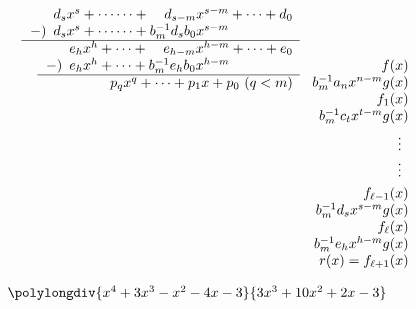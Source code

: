 \begin{table}
\begin{lrbox}{\EuclidChangchu}
\begin{math}
\begin{array}{@{}l@{\hspace*{-6pt}}c@{\hspace*{-7pt}}l@{\hspace*{-11pt}}r@{\hspace*{-14pt}}l@{}}
\begin{array}[t]{l}
\begin{array}{r}
\begin{array}{r@{\hspace{5pt}}r@{{}+\dotsb\dotsb+{}}r@{}l}
               & d_sx^s &     d_{s-m}x^{s-m} & {}+\dotsb+d_0 \\
\left.-\right) & d_sx^s & b_m^{-1}d_sb_0x^{s-m} \\ \hline  \end{array}\\
\begin{array}{r@{\hspace{5pt}}r@{{}+\dotsb+{}}r@{}l}
               & e_hx^h &     e_{h-m}x^{h-m} & {}+\dotsb+e_0 \\
\left.-\right) & e_hx^h & b_m^{-1}e_hb_0x^{h-m} \\ \hline \end{array} \\
\begin{array}{c} p_qx^q+\dotsb+p_1x+p_0~(q<m) \end{array}
\end{array}\end{array}
& \begin{array}[t]{r@{}}
\\ f(x) \\ b_m^{-1}a_nx^{n-m}g(x) \\ f_1(x) \\ b_m^{-1}c_tx^{t-m}g(x) \\[3pt] \vdots\enspace \\ \vdots\enspace \\[3pt]
f_{\ell-1}(x) \\ b_m^{-1}d_sx^{s-m}g(x) \\ f_{\ell}(x) \\ b_m^{-1}e_hx^{h-m}g(x) \\ r(x)=f_{\ell+1}(x) \end{array}
\end{array}\end{math}
\end{lrbox}
\begin{lrbox}{\EuclidLiTi}
\begin{math}
\polylongdiv{x^4+3x^3-x^2-4x-3}{3x^3+10x^2+2x-3}
\end{math}
\end{lrbox}
\CenterFloatBoxes
\begin{floatrow}[5]
\tablebox{}{\rule{.6pt}{.8\wd\EuclidChangchu}}
\end{floatrow}
\end{table}

